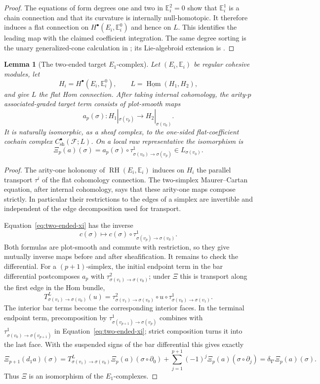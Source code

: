 \documentclass[12pt]{amsart}
\newtheorem{lem}[thm]{Lemma}
\theoremstyle{definition}
\theoremstyle{remark}
\numberwithin{equation}{section}
\newcommand{\CF}{{\mathcal F}}
\newcommand{\1}{{\mathbb{1}}}
\newcommand{\RH}{\operatorname{RH}}
\newcommand{\Hom}{\operatorname{Hom}}
\begin{document}
\begin{proof}
The equations of form degrees one and two in
$\mathbb E_i^2=0$ show that $\mathbb E_i^1$ is a chain connection and
that its curvature is internally null-homotopic.  It therefore induces
a flat connection on $H^\bullet(E_i,\mathbb E_i^0)$ and hence on $L$.
This identifies the leading map with the claimed coefficient
integration.  The same degree sorting is the unary generalized-cone
calculation in \cite[Sections 3.4--4.1]{BS14}; its Lie-algebroid
extension is \cite[Theorem 4.18]{AS12}.
\end{proof}

\begin{lem}[The two-ended target $E_1$-complex]
\label{lem:target-e1}
Let $(E_i,\mathbb E_i)$ be regular cohesive modules, let
\[
 H_i=H^\bullet(E_i,\mathbb E_i^0),
 \qquad
 L=\underline{\Hom}(H_1,H_2),
\]
and give $L$ the flat Hom connection.  After taking internal
cohomology, the arity-$p$ associated-graded target term consists of
plot-smooth maps
\[
 a_p(\sigma):
 H_1|_{\sigma(v_p)}
 \longrightarrow
 H_2|_{\sigma(v_0)}.
\]
It is naturally isomorphic, as a sheaf complex, to the one-sided
flat-coefficient cochain complex
$C^\bullet_{\mathrm{sh}}(\CF;L)$.  On a local raw representative the
isomorphism is
\begin{equation}\label{eq:two-ended-xi}
 \Xi_p(a)(\sigma)
 =
 a_p(\sigma)\circ
 \tau^1_{\sigma(v_0)\to\sigma(v_p)}
 \in L_{\sigma(v_0)}.
\end{equation}
\end{lem}

\begin{proof}
The arity-one holonomy of $\RH(E_i,\mathbb E_i)$ induces on $H_i$
the parallel transport $\tau^i$ of the flat cohomology connection.
The two-simplex Maurer--Cartan equation, after internal cohomology,
says that these arity-one maps compose strictly.  In particular their
restrictions to the edges of a simplex are invertible and independent
of the edge decomposition used for transport.

Equation~\eqref{eq:two-ended-xi} has the inverse
\[
 c(\sigma)\longmapsto
 c(\sigma)\circ
 \tau^1_{\sigma(v_p)\to\sigma(v_0)}.
\]
Both formulas are plot-smooth and commute with restriction, so they
give mutually inverse maps before and after sheafification.  It
remains to check the differential.  For a $(p+1)$-simplex, the
initial endpoint term in the bar differential postcomposes $a_p$ with
$\tau^2_{\sigma(v_1)\to\sigma(v_0)}$; under $\Xi$ this is transport
along the first edge in the Hom bundle,
\[
 T^L_{\sigma(v_1)\to\sigma(v_0)}(u)
 =
 \tau^2_{\sigma(v_1)\to\sigma(v_0)}
 \circ u\circ
 \tau^1_{\sigma(v_0)\to\sigma(v_1)}.
\]
The interior bar terms become the corresponding interior faces.  In
the terminal endpoint term, precomposition by
$\tau^1_{\sigma(v_{p+1})\to\sigma(v_p)}$ combines with
$\tau^1_{\sigma(v_0)\to\sigma(v_{p+1})}$ in
Equation~\eqref{eq:two-ended-xi}; strict composition turns it into the
last face.  With the suspended signs of the bar differential this
gives exactly
\[
 \Xi_{p+1}(d_1a)(\sigma)
 =
 T^L_{\sigma(v_1)\to\sigma(v_0)}
   \Xi_p(a)(\sigma\circ\partial_0)
 +\sum_{j=1}^{p+1}(-1)^j
   \Xi_p(a)(\sigma\circ\partial_j)
 =
 \delta_\nabla\Xi_p(a)(\sigma).
\]
Thus $\Xi$ is an isomorphism of the $E_1$-complexes.
\end{proof}
\end{document}
